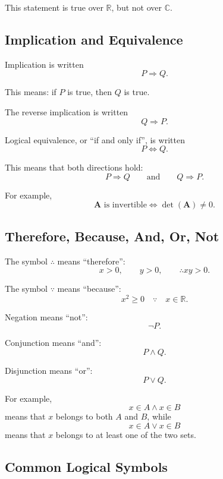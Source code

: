 \documentclass[11pt,twocolumn]{article}
\newcommand{\R}{\mathbb{R}}
\newcommand{\C}{\mathbb{C}}
\newcommand{\mat}[1]{\symbf{#1}}     %
\newcommand{\determinant}{\operatorname{det}}
\begin{document}
This statement is true over \(\R\), but not over \(\C\).

\subsection{Implication and Equivalence}

Implication is written
\[
P \Rightarrow Q.
\]

This means: if \(P\) is true, then \(Q\) is true.

The reverse implication is written
\[
Q \Rightarrow P.
\]

Logical equivalence, or ``if and only if'', is written
\[
P \Leftrightarrow Q.
\]

This means that both directions hold:
\[
P \Rightarrow Q
\qquad
\text{and}
\qquad
Q \Rightarrow P.
\]

For example,
\[
\mat{A} \text{ is invertible}
\Leftrightarrow
\determinant(\mat{A}) \ne 0.
\]

\subsection{Therefore, Because, And, Or, Not}

The symbol \(\therefore\) means ``therefore'':
\[
x>0,
\qquad
y>0,
\qquad
\therefore xy>0.
\]

The symbol \(\because\) means ``because'':
\[
x^2 \ge 0
\quad
\because
\quad
x \in \R.
\]

Negation means ``not'':
\[
\neg P.
\]

Conjunction means ``and'':
\[
P \land Q.
\]

Disjunction means ``or'':
\[
P \lor Q.
\]

For example,
\[
x \in A \land x \in B
\]
means that \(x\) belongs to both \(A\) and \(B\), while
\[
x \in A \lor x \in B
\]
means that \(x\) belongs to at least one of the two sets.

\subsection{Common Logical Symbols}
\end{document}
